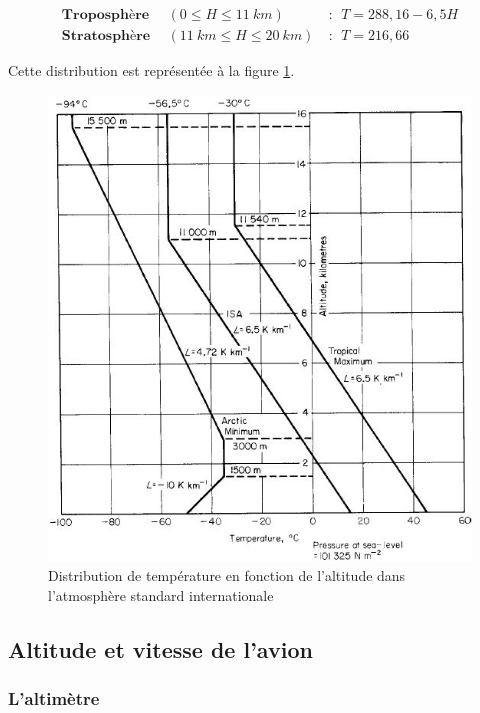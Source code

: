 \documentclass{report}
\begin{document}
\begin{eqnarray}
\textbf{Troposphère} &~~(0\le H\le 11~km)~&:~~T=288,16-6,5H\\
\textbf{Stratosphère} &~~(11~km\le H\le 20~km)~&:~~T=216,66
\end{eqnarray}

Cette distribution est représentée à la figure \ref{2}.

\begin{figure}[h!]
    \centering
    \includegraphics{2.JPG}
    \caption{Distribution de température en fonction de l’altitude dans l’atmosphère standard internationale}
    \label{2}
\end{figure}

\subsection{Altitude et vitesse de l'avion}
\subsubsection{L'altimètre}
\end{document}
